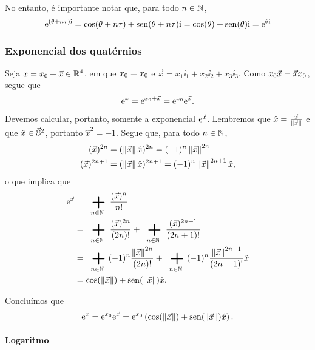 No entanto, é importante notar que, para todo $n \in \N$,
	\begin{equation*}
	\e^{(\theta+n\tau) \ii} = \cos(\theta+n\tau)+\sin(\theta+n\tau) \ii = \cos(\theta)+\sin(\theta) \ii = \e^{\theta \ii}
	\end{equation*}

\subsubsection{Exponencial dos quatérnios}

Seja $x = \esc{x} + \vec{x} \in \R^4$, em que $\esc{x} = x_0$ e $\vec{x} = x_1 \ii_1 + x_2 \ii_2 + x_3 \ii_3$. Como $\esc{x}\vec{x} = \vec{x}\esc{x}$, segue que
	\begin{equation*}
	\e^{x} = \e^{\esc{x}+\vec{x}} = \e^{\esc{x}}\e^{\vec{x}}.
	\end{equation*}

Devemos calcular, portanto, somente a exponencial $\e^{\vec{x}}$. Lembremos que $\hat{x} = \frac{\vec{x}}{\nor{\vec{x}}}$ e que $\hat{x} \in \vec{\S}^2$, portanto $\hat{x}^2 = -1$. Segue que, para todo $n \in \N$,
	\begin{align*}
	(\vec{x})^{2n} &= (\nor{\vec{x}} \hat{x})^{2n} = (-1)^n \nor{\vec{x}}^{2n} \\
	(\vec{x})^{2n+1} &= (\nor{\vec{x}} \hat{x})^{2n+1} = (-1)^n \nor{\vec{x}}^{2n+1}\hat{x},
	\end{align*}
o que implica que
	\begin{align*}
	\e^{\vec{x}} &= \sum_{n \in \N} \frac{(\vec{x})^n}{n!} \\
		&= \sum_{n \in \N} \frac{(\vec{x})^{2n}}{(2n)!} + \sum_{n \in \N} \frac{(\vec{x})^{2n+1}}{(2n+1)!} \\
		&= \sum_{n \in \N} (-1)^n \frac{\nor{\vec{x}}^{2n}}{(2n)!} + \sum_{n \in \N} (-1)^n \frac{\nor{\vec{x}}^{2n+1}}{(2n+1)!}\hat{x} \\
		&= \cos(\nor{\vec{x}}) + \sin(\nor{\vec{x}}) \hat{x}.
	\end{align*}

Concluímos que
	\begin{equation*}
		\e^{x} = \e^{\esc{x}}\e^{\vec{x}} = \e^{\esc{x}}\left( \cos(\nor{\vec{x}}) + \sin(\nor{\vec{x}}) \hat{x} \right).
	\end{equation*}

\paragraph{Logaritmo}

